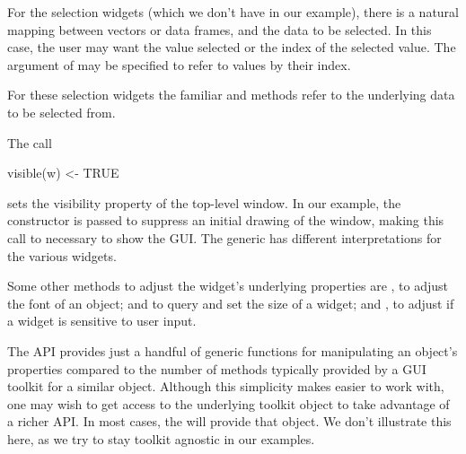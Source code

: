For the selection widgets (which we don't have in our example), there
is a natural mapping between vectors or data frames, and the data to
be selected. In this case, the user may want the value selected or the
index of the selected value. The  argument of
 may be specified to refer to values by their index. 

For these selection widgets the familiar \meth{[} and \meth{[\ASSIGN}
methods refer to the underlying data to be selected from.



The call
\begin{Schunk}
\begin{Sinput}
 visible(w) <- TRUE
\end{Sinput}
\end{Schunk}
%
sets the visibility property of the top-level window. In our example,
the  constructor is passed  to
suppress an initial drawing of the window, making this call to
 necessary to show the GUI. The
 generic has different interpretations for the
various widgets.

Some other methods to adjust the widget's underlying properties are
, to adjust the font of an object;  and
 to query and set the size of a widget; and
, to adjust if a widget is sensitive to user
input.


The  API provides just a handful of generic functions
for manipulating an object's properties compared to the number of
methods typically provided by a GUI toolkit for a similar
object. Although this simplicity makes  easier to work
with, one may wish to get access to the underlying toolkit object to
take advantage of a richer API. In most cases, the
 will provide that object. We don't
illustrate this here, as we try to stay toolkit agnostic in our
examples.


